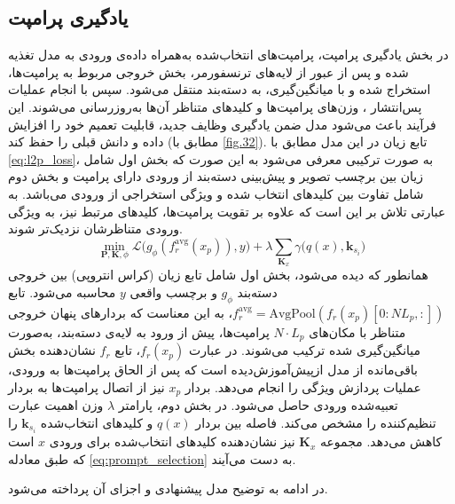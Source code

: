 \subsection{یادگیری پرامپت}
در بخش یادگیری پرامپت، پرامپت‌های انتخاب‌شده به‌همراه داده‌ی ورودی به مدل تغذیه شده و پس از عبور از لایه‌های ترنسفورمر، بخش خروجی مربوط به پرامپت‌ها، استخراج شده و با میانگین‌گیری، به دسته‌بند  منتقل می‌شود. سپس با انجام عملیات پس‌انتشار ، وزن‌های پرامپت‌ها و کلیدهای متناظر آن‌ها به‌روزرسانی می‌شوند. این فرآیند باعث می‌شود مدل ضمن یادگیری وظایف جدید، قابلیت تعمیم خود را افزایش داده و دانش قبلی را حفظ کند (مطابق با \cref{fig.32}). تابع زیان در این مدل مطابق با \eqref{eq:l2p_loss}، به صورت ترکیبی معرفی می‌شود به این صورت که بخش اول شامل زیان بین برچسب تصویر و پیش‌بینی دسته‌بند از ورودی دارای پرامپت و بخش دوم شامل تفاوت بین کلیدهای انتخاب شده و ویژگی استخراجی از ورودی می‌باشد. به عبارتی تلاش بر این است که علاوه بر تقویت پرامپت‌ها، کلیدهای مرتبط نیز، به ویژگی ورودی متناظرشان نزدیک‌‌‌تر شوند. 
\begin{equation}\label{eq:l2p_loss}
	\min_{\mathbf{P}, \mathbf{K}, \phi} 
	\mathcal{L}\big( g_{\phi}( f_r^{\mathrm{avg}} (x_p) ), y \big) 
	+ \lambda \sum_{\mathbf{K}_x} \gamma \big( q(x), \mathbf{k}_{s_i} \big)
\end{equation}
همانطور که دیده می‌شود، بخش اول شامل تابع زیان (کراس انتروپی) بین خروجی دسته‌بند \(g_{\phi}\) و برچسب واقعی \(y\) محاسبه می‌شود. تابع \( f_r^{\mathrm{avg}} = \mathrm{AvgPool}(f_r(x_p)[0 : N L_p, :]) \)، به این معناست که بردارهای پنهان خروجی متناظر با مکان‌های \( N \cdot L_p \) پرامپت‌ها، پیش از ورود به لایه‌ی دسته‌بند، به‌صورت میانگین‌گیری شده ترکیب می‌شوند. 
در عبارت \( f_r(x_p) \)، تابع \( f_r \) نشان‌دهنده بخش باقی‌مانده از مدل ازپیش‌آموزش‌دیده است که پس از الحاق پرامپت‌ها به ورودی، عملیات پردازش ویژگی را انجام می‌دهد. 
بردار \( x_p \) نیز از اتصال پرامپت‌ها به بردار تعبیه‌شده ورودی حاصل می‌شود. در بخش دوم، پارامتر \(\lambda\) وزن اهمیت عبارت تنظیم‌کننده را مشخص می‌کند. فاصله بین بردار \(q(x)\) و کلیدهای انتخاب‌شده \(\mathbf{k}_{s_i}\) را کاهش می‌دهد. مجموعه \(\mathbf{K}_x\) نیز نشان‌دهنده کلیدهای انتخاب‌شده برای ورودی \(x\) است که طبق معادله \eqref{eq:prompt_selection} به دست می‌آیند.

در ادامه به توضیح مدل پیشنهادی و اجزای آن پرداخته می‌شود. 

